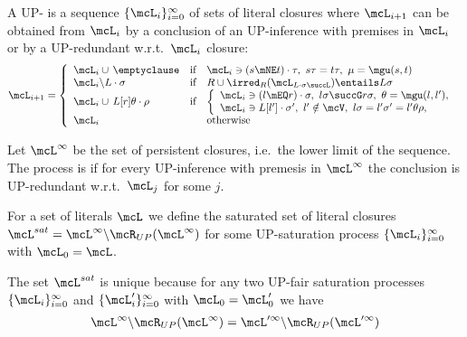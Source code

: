 \begin{definition}
    A UP- is
    a sequence \( \{ \mcL_i \}_{i=0}^\infty \)
    of sets of literal closures where
    \( \mcL_{i+1} \) can be obtained from
    \( \mcL_i \)
    by  a conclusion of an UP-inference with premises in $\mcL_i$
    or by  a UP-redundant w.r.t.~\(\mcL_i\) closure:
    \begin{gather*}
        \mcL_{i+1} = \left\{
            \begin{array}{lclc}
                \mcL_i \cup\,\emptyclause
                &\text{if}
                &
                    \mcL_i\ni(s\mNE t)\cdot\tau,\ {}
                    s\tau = t\tau,\ {}
                    \mu=\mgu(s,t)
                \\
                \mcL_i \backslash L\cdot\sigma
                &\text{if}
                &R \cup \irred_R(\mcL_{L\cdot\sigma\succL}) \entails L\sigma
                \\
                \mcL_i \cup\, L[r]\theta\cdot\rho
                &\text{if}
                &\left\{\begin{array}{l}
                    \mcL_i\ni(l\mEQ r)\cdot\sigma,\ {}
                    l\sigma\succG r\sigma,\ {}
                    \theta=\mgu(l,l'),
                    \\
                    \mcL_i\ni L[l']\cdot\sigma',\ {}
                    l'\notin\mcV,\ {}
                    l\sigma = l'\sigma' = l'\theta\rho,
                \end{array}\right.
                \\
                \mcL_i
                &&\text{otherwise}
            \end{array}
        \right.
    \end{gather*}

    Let \( \mcL^\infty \) be the set of persistent closures,
    i.e.~the lower limit of the sequence.
    The process is  if for every UP-inference
    with premesis in \( \mcL^\infty \) the conclusion is UP-redundant
    w.r.t.~\(\mcL_j\) for some \(j\).

    For a set of literals \( \mcL \) we define
    the saturated set of literal closures
    \( \mcL^{sat} = \mcL^\infty\backslash\mcR_{UP}(\mcL^\infty) \)
    for some UP-saturation process
    \( \{ \mcL_i\}_{i=0}^\infty \)
    with $\mcL_0 = \mcL$.
\end{definition}

\begin{lemma}
    The set \( \mcL^{sat} \) is unique because
    for any two UP-fair saturation processes
    \(\{ \mcL_i
        \}_{i=0}^\infty\) and
        \(\{ \mcL'_i
        \}_{i=0}^\infty\)
        with $\mcL_0 = \mcL'_0$ we have
        \begin{gather*}
            \mcL^\infty \backslash \mcR_{UP}(\mcL^\infty)
            =
            \mcL'^\infty \backslash \mcR_{UP}(\mcL'^\infty)
        \end{gather*}
\end{lemma}

